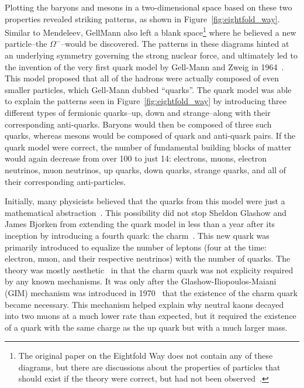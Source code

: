 Plotting the baryons and mesons in a two-dimensional space based on these two properties revealed striking patterns, as shown in Figure~\ref{fig:eightfold_way}. Similar to Mendeleev, GellMann also left a blank space\footnote{The original paper on the Eightfold Way does not contain any of these diagrams, but there are discussions about the properties of particles that should exist if the theory were correct, but had not been observed~\cite{GellMannEightfold}.} where he believed a new particle--the $\Omega^{-}$--would be discovered.  The patterns in these diagrams hinted at an underlying symmetry governing the strong nuclear force, and ultimately led to the invention of the very first quark model by Gell-Mann and Zweig in 1964~\cite{QuarkModel}. This model proposed that all of the hadrons were actually composed of even smaller particles, which Gell-Mann dubbed ``quarks''. The quark model was able to explain the patterns seen in Figure~\ref{fig:eightfold_way} by introducing three different types of fermionic quarks--up, down and strange--along with their corresponding anti-quarks. Baryons would then be composed of three such quarks, whereas mesons would be composed of quark and anti-quark pairs. If the quark model were correct, the number of fundamental building blocks of matter would again decrease from over 100 to just 14: electrons, muons, electron neutrinos, muon neutrinos, up quarks, down quarks, strange quarks, and all of their corresponding anti-particles.


Initially, many physicists believed that the quarks from this model were just a mathematical abstraction~\cite{QuarkAbstraction}. This possibility did not stop Sheldon Glashow and James Bjorken from extending the quark model in less than a year after its inception by introducing a fourth quark: the charm~\cite{CharmQuark}. This new quark was primarily introduced to equalize the number of leptons (four at the time: electron, muon, and their respective neutrinos) with the number of quarks. The theory was mostly aesthetic~\cite{AestheticCharm} in that the charm quark was not explicity required by any known mechanisms. It was only after the Glashow-Iliopoulos-Maiani (GIM) mechanism was introduced in 1970~\cite{GIM} that the existence of the charm quark became necessary. This mechanism helped explain why neutral kaons decayed into two muons at a much lower rate than expected, but it required the existence of a quark with the same charge as the up quark but with a much larger mass.

